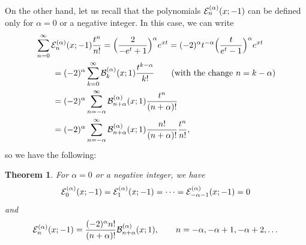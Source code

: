 \documentclass[11pt,a4paper]{amsart}
\newcommand{\B}[1][]{\mathcal{B}\ifx#1\empty\else^{(#1)}\fi}
\newcommand{\E}[1][]{\mathcal{E}\ifx#1\empty\else^{(#1)}\fi}
\theoremstyle{plain}
\newtheorem{theor}{Theorem}
\theoremstyle{plain}
\theoremstyle{plain}
\begin{document}
On the other hand, let us recall that the polynomials $\E[\alpha]_n(x;-1)$ can be defined only for $\alpha = 0$ or a negative integer.
In this case, we can write
\begin{align*}
  &\sum_{n=0}^{\infty} \E[\alpha]_{n}(x;-1) \frac{t^n}{n!}
  = \Big( \frac{2}{-e^t+1} \Big)^\alpha e^{xt} 
  = (-2)^{\alpha} t^{-\alpha} \Big( \frac{t}{e^t-1} \Big)^\alpha e^{xt} \\
  &\qquad = (-2)^\alpha \sum_{k=0}^{\infty} \B[\alpha]_{k}(x;1) \frac{t^{k-\alpha}}{k!} 
  \qquad\text{(with the change $n=k-\alpha$)} \\
  &\qquad = (-2)^\alpha \sum_{n=-\alpha}^{\infty} \B[\alpha]_{n+\alpha}(x;1) \frac{t^{n}}{(n+\alpha)!} \\
  &\qquad = (-2)^\alpha \sum_{n=-\alpha}^{\infty} \B[\alpha]_{n+\alpha}(x;1) \frac{n!}{(n+\alpha)!} \frac{t^{n}}{n!},
\end{align*}
so we have the following:

\begin{theor}
For $\alpha = 0$ or a negative integer, we have
\[
  \E[\alpha]_{0}(x;-1) = \E[\alpha]_{1}(x;-1) = \cdots = \E[\alpha]_{-\alpha-1}(x;-1) = 0
\]
and
\begin{equation}
\label{eq:E1toB1}
  \E[\alpha]_{n}(x;-1) = \frac{(-2)^\alpha n!}{(n+\alpha)!} \B[\alpha]_{n+\alpha}(x;1),
  \qquad n = -\alpha, -\alpha+1, -\alpha+2, \dots
\end{equation}
\end{theor}
\end{document}
